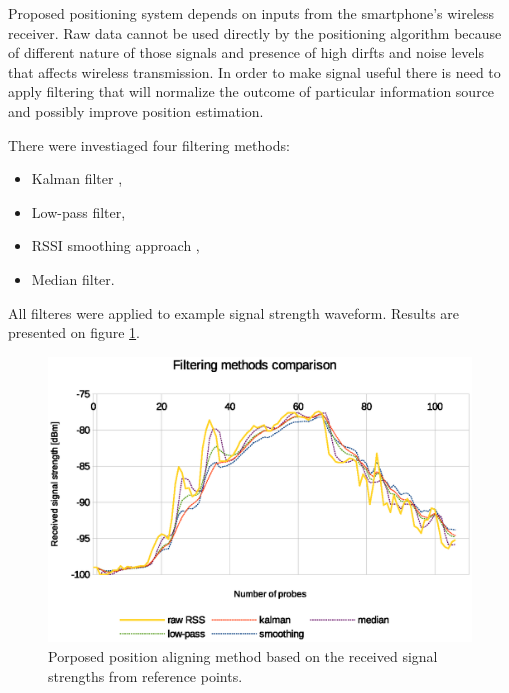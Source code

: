 \documentclass[../main.tex]{subfiles}
\begin{document}
Proposed positioning system depends on inputs from the smartphone's wireless receiver. Raw data cannot be used directly by the positioning algorithm because of different nature of those signals and presence of high dirfts and noise levels that affects wireless transmission. In order to make signal useful there is need to apply filtering that will normalize the outcome of particular information source and possibly improve position estimation.

There were investiaged four filtering methods:
\begin{itemize}
	\item Kalman filter \cite{article_rss_kalman},
	\item Low-pass filter,
	\item RSSI smoothing approach \cite{rssi_smoothing},
	\item Median filter.
\end{itemize}

All filteres were applied to example signal strength waveform. Results are presented on figure \ref{fig:filtering_comparison}.

\begin{figure}[!htbp]
\includegraphics[width=\textwidth]{pictures/filtering_comparison}
\centering
\caption{Porposed position aligning method based on the received signal strengths from reference points.}
\label{fig:filtering_comparison}
\end{figure}
\end{document}
